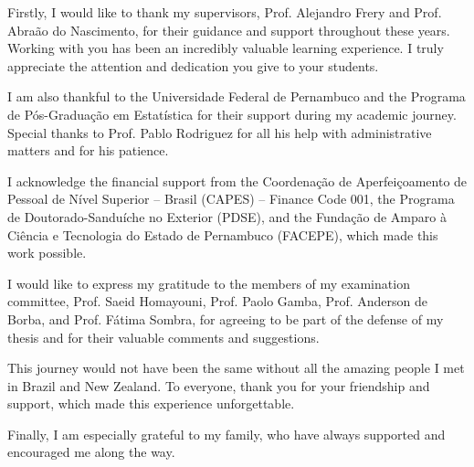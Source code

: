


Firstly, I would like to thank my supervisors, Prof. Alejandro Frery and Prof. Abraão do Nascimento, for their guidance and support throughout these years. Working with you has been an incredibly valuable learning experience. I truly appreciate the attention and dedication you give to your students.

I am also thankful to the Universidade Federal de Pernambuco and the Programa de
Pós-Graduação em Estatística for their support during my academic journey. Special thanks to Prof. Pablo Rodriguez for all his help with administrative matters and for his patience.

I acknowledge the financial support from the Coordenação de Aperfeiçoamento de Pessoal de Nível Superior – Brasil (CAPES) – Finance Code 001, the Programa de Doutorado-Sanduíche no Exterior (PDSE), and the Fundação de Amparo à Ciência e Tecnologia do Estado de Pernambuco (FACEPE), which made this work possible.

I would like to express my gratitude to the members of my examination committee, Prof. Saeid Homayouni, Prof. Paolo Gamba, Prof. Anderson de Borba, and Prof. Fátima Sombra, for agreeing to be part of the defense of my thesis and for their valuable comments and suggestions.

This journey would not have been the same without all the amazing people I met in Brazil and New Zealand. To everyone, thank you for your friendship and support, which made this experience unforgettable.

Finally, I am especially grateful to my family, who have always supported and encouraged me along the way.